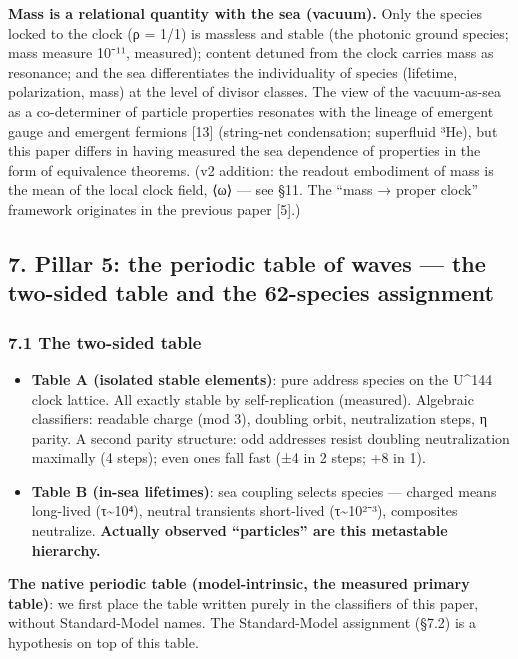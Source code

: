 \documentclass[
]{article}
\providecommand{\tightlist}{%
  \setlength{\itemsep}{0pt}\setlength{\parskip}{0pt}}
\begin{document}
\textbf{Mass is a relational quantity with the sea (vacuum).} Only the
species locked to the clock (ρ = 1/1) is massless and stable (the
photonic ground species; mass measure 10⁻¹¹, measured); content detuned
from the clock carries mass as resonance; and the sea differentiates the
individuality of species (lifetime, polarization, mass) at the level of
divisor classes. The view of the vacuum-as-sea as a co-determiner of
particle properties resonates with the lineage of emergent gauge and
emergent fermions {[}13{]} (string-net condensation; superfluid ³He),
but this paper differs in having measured the sea dependence of
properties in the form of equivalence theorems. (v2 addition: the
readout embodiment of mass is the mean of the local clock field, ⟨ω⟩ ---
see §11. The ``mass → proper clock'' framework originates in the
previous paper {[}5{]}.)

\subsection{7. Pillar 5: the periodic table of waves --- the two-sided
table and the 62-species
assignment}\label{pillar-5-the-periodic-table-of-waves-the-two-sided-table-and-the-62-species-assignment}

\subsubsection{7.1 The two-sided table}\label{the-two-sided-table}

\begin{itemize}
\tightlist
\item
  \textbf{Table A (isolated stable elements)}: pure address species on
  the U\^{}144 clock lattice. All exactly stable by self-replication
  (measured). Algebraic classifiers: readable charge (mod 3), doubling
  orbit, neutralization steps, η parity. A second parity structure: odd
  addresses resist doubling neutralization maximally (4 steps); even
  ones fall fast (±4 in 2 steps; +8 in 1).
\item
  \textbf{Table B (in-sea lifetimes)}: sea coupling selects species ---
  charged means long-lived (τ\textasciitilde10⁴), neutral transients
  short-lived (τ\textasciitilde10²⁻³), composites neutralize.
  \textbf{Actually observed ``particles'' are this metastable
  hierarchy.}
\end{itemize}

\textbf{The native periodic table (model-intrinsic, the measured primary
table)}: we first place the table written purely in the classifiers of
this paper, without Standard-Model names. The Standard-Model assignment
(§7.2) is a hypothesis on top of this table.
\end{document}
